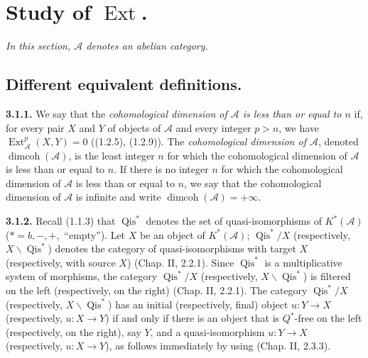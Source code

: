 \clearpage
{}%
\begingroup\small\setlength{\parskip}{0pt}\setlength{\emergencystretch}{1.5em}
\setlength{\abovedisplayskip}{4pt plus 2pt minus 2pt}%
\setlength{\belowdisplayskip}{4pt plus 2pt minus 2pt}%

\section{Study of \texorpdfstring{$\operatorname{Ext}$}{Ext}.}

\noindent\textit{In this section, $\mathcal A$ denotes an abelian category.}

\subsection{Different equivalent definitions.}

\noindent\textbf{3.1.1.}\quad
We say that the \emph{cohomological dimension of $\mathcal A$ is less than
or equal to $n$} if, for every pair $X$ and $Y$ of objects of $\mathcal A$
and every integer $p>n$, we have
$\operatorname{Ext}_{\mathcal A}^{p}(X,Y)=0$ ((1.2.5), (1.2.9)). The
\emph{cohomological dimension of $\mathcal A$}, denoted
$\operatorname{dimcoh}(\mathcal A)$, is the least integer $n$ for which the
cohomological dimension of $\mathcal A$ is less than or equal to $n$. If
there is no integer $n$ for which the cohomological dimension of $\mathcal A$
is less than or equal to $n$, we say that the cohomological dimension of
$\mathcal A$ is infinite and write
$\operatorname{dimcoh}(\mathcal A)=+\infty$.

\noindent\textbf{3.1.2.}\quad
Recall (1.1.3) that $\operatorname{Qis}^{*}$ denotes the set of
quasi-isomorphisms of $K^{*}(\mathcal A)$
($*=b,-,+,{}$ ``empty''). Let $X$ be an object of $K^{*}(\mathcal A)$;
$\operatorname{Qis}^{*}/X$ (respectively,
$X\backslash\operatorname{Qis}^{*}$) denotes the category of
quasi-isomorphisms with target $X$ (respectively, with source $X$)
(Chap. II, 2.2.1). Since $\operatorname{Qis}^{*}$ is a multiplicative system
of morphisms, the category $\operatorname{Qis}^{*}/X$ (respectively,
$X\backslash\operatorname{Qis}^{*}$) is filtered on the left (respectively,
on the right) (Chap. II, 2.2.1). The category
$\operatorname{Qis}^{*}/X$ (respectively,
$X\backslash\operatorname{Qis}^{*}$) has an initial (respectively, final)
object $u\colon Y\longrightarrow X$ (respectively,
$u\colon X\longrightarrow Y$) if and only if there is an object that is
$Q^{*}$-free on the left (respectively, on the right), say $Y$, and a quasi-isomorphism
$u\colon Y\longrightarrow X$ (respectively,
$u\colon X\longrightarrow Y$), as follows immediately by using
(Chap. II, 2.3.3).

